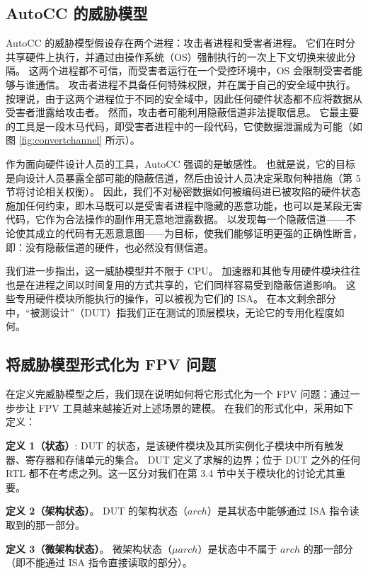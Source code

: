 \subsection{AutoCC 的威胁模型}

AutoCC 的威胁模型假设存在两个进程：攻击者进程和受害者进程。
它们在时分共享硬件上执行，并通过由操作系统（OS）强制执行的一次上下文切换来彼此分隔。
这两个进程都不可信，而受害者运行在一个受控环境中，OS 会限制受害者能够与谁通信。
攻击者进程不具备任何特殊权限，并在属于自己的安全域中执行。
按理说，由于这两个进程位于不同的安全域中，因此任何硬件状态都不应将数据从受害者泄露给攻击者。
然而，攻击者可能利用隐蔽信道非法提取信息。
它最主要的工具是一段木马代码，即受害者进程中的一段代码，它使数据泄漏成为可能（如图 \ref{fig:convertchannel} 所示）。

作为面向硬件设计人员的工具，AutoCC 强调的是敏感性。
也就是说，它的目标是向设计人员暴露全部可能的隐蔽信道，然后由设计人员决定采取何种措施（第 5 节将讨论相关权衡）。
因此，我们不对秘密数据如何被编码进已被攻陷的硬件状态施加任何约束，即木马既可以是受害者进程中隐藏的恶意功能，也可以是某段无害代码，它作为合法操作的副作用无意地泄露数据。
以发现每一个隐蔽信道——不论使其成立的代码有无恶意意图——为目标，使我们能够证明更强的正确性断言，即：没有隐蔽信道的硬件，也必然没有侧信道。

我们进一步指出，这一威胁模型并不限于 CPU。
加速器和其他专用硬件模块往往也是在进程之间以时间复用的方式共享的，它们同样容易受到隐蔽信道影响。
这些专用硬件模块所能执行的操作，可以被视为它们的 ISA。
在本文剩余部分中，“被测设计”（DUT）指我们正在测试的顶层模块，无论它的专用化程度如何。

\subsection{将威胁模型形式化为 FPV 问题}

在定义完威胁模型之后，我们现在说明如何将它形式化为一个 FPV 问题：通过一步步让 FPV 工具越来越接近对上述场景的建模。
在我们的形式化中，采用如下定义：

\textbf{定义 1（状态）}: DUT 的状态，是该硬件模块及其所实例化子模块中所有触发器、寄存器和存储单元的集合。
DUT 定义了求解的边界；位于 DUT 之外的任何 RTL 都不在考虑之列。这一区分对我们在第 3.4 节中关于模块化的讨论尤其重要。

\textbf{定义 2（架构状态）}。 DUT 的架构状态（$arch$）是其状态中能够通过 ISA 指令读取到的那一部分。

\textbf{定义 3（微架构状态）}。 微架构状态（$\mu arch$）是状态中不属于 $arch$ 的那一部分（即不能通过 ISA 指令直接读取的部分）。

